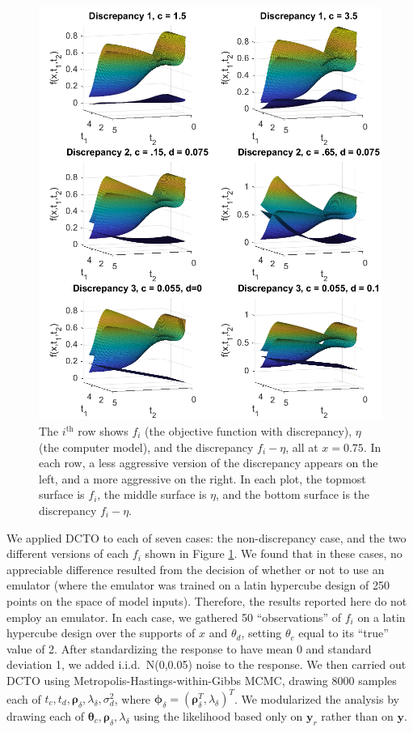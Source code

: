 \documentclass[12pt]{article}
\begin{document}
\begin{figure}
\centering
\includegraphics[scale=0.85]{FIG_six_discrepancies}
\captionsetup{width=.85\linewidth}
\caption{The $i^{\text{th}}$ row shows $f_i$ (the objective function with discrepancy), $\eta$ (the computer model), and the discrepancy $f_i-\eta$, all at $x=0.75$. In each row, a less aggressive version of the discrepancy appears on the left, and a more aggressive on the right. In each plot, the topmost surface is $f_i$, the middle surface is $\eta$, and the bottom surface is the discrepancy $f_i-\eta$.}
\label{fig:discrepancies}
\end{figure}
%

%
We applied DCTO to each of seven cases: the non-discrepancy case, and the two different versions of each $f_i$ shown in Figure \ref{fig:discrepancies}.
%
We found that in these cases, no appreciable difference resulted from the decision of whether or not to use an emulator (where the emulator was trained on a latin hypercube design of 250 points on the space of model inputs).
%
Therefore, the results reported here do not employ an emulator.
%
In each case, we gathered 50 ``observations'' of $f_i$ on a latin hypercube design over the supports of $x$ and $\theta_d$, setting $\theta_c$ equal to its ``true'' value of 2.
%
After standardizing the response to have mean 0 and standard deviation 1, we added i.i.d.\ N(0,0.05) noise to the response.
%
We then carried out DCTO using Metropolis-Hastings-within-Gibbs MCMC, drawing 8000 samples each of $t_c,t_d,\boldsymbol\rho_{\delta},\lambda_{\delta},\sigma^2_d$, where $\boldsymbol\phi_\delta = (\boldsymbol\rho_\delta^T,\lambda_\delta)^T$.
%
We modularized the analysis by drawing each of $\boldsymbol\theta_c,\boldsymbol\rho_\delta,\lambda_\delta$ using the likelihood based only on $\mathbf y_r$ rather than on $\mathbf y$.
%
\end{document}
